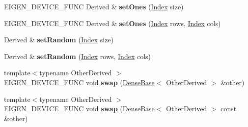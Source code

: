 \begin{DoxyCompactItemize}
E\+I\+G\+E\+N\+\_\+\+D\+E\+V\+I\+C\+E\+\_\+\+F\+U\+NC Derived \& {\bfseries set\+Ones} (\hyperlink{namespace_eigen_a62e77e0933482dafde8fe197d9a2cfde}{Index} size)
\item 
\mbox{\label{class_eigen_1_1_plain_object_base_a244c15ed04668e3b22b2ac600ada2cd8}} 
E\+I\+G\+E\+N\+\_\+\+D\+E\+V\+I\+C\+E\+\_\+\+F\+U\+NC Derived \& {\bfseries set\+Ones} (\hyperlink{namespace_eigen_a62e77e0933482dafde8fe197d9a2cfde}{Index} rows, \hyperlink{namespace_eigen_a62e77e0933482dafde8fe197d9a2cfde}{Index} cols)
\item 
\mbox{\label{class_eigen_1_1_plain_object_base_a3c917b35f8f603965c0dbe27de50e71e}} 
Derived \& {\bfseries set\+Random} (\hyperlink{namespace_eigen_a62e77e0933482dafde8fe197d9a2cfde}{Index} size)
\item 
\mbox{\label{class_eigen_1_1_plain_object_base_a12dd30c1a129192cc6f812efb9061b86}} 
Derived \& {\bfseries set\+Random} (\hyperlink{namespace_eigen_a62e77e0933482dafde8fe197d9a2cfde}{Index} rows, \hyperlink{namespace_eigen_a62e77e0933482dafde8fe197d9a2cfde}{Index} cols)
\item 
\mbox{\label{class_eigen_1_1_plain_object_base_aa86254240c534cc55143f38af58c8bdf}} 
{\footnotesize template$<$typename Other\+Derived $>$ }\\E\+I\+G\+E\+N\+\_\+\+D\+E\+V\+I\+C\+E\+\_\+\+F\+U\+NC void {\bfseries swap} (\hyperlink{group___core___module_class_eigen_1_1_dense_base}{Dense\+Base}$<$ Other\+Derived $>$ \&other)
\item 
\mbox{\label{class_eigen_1_1_plain_object_base_a7a975e6a0ec50637ef56e72dc732717e}} 
{\footnotesize template$<$typename Other\+Derived $>$ }\\E\+I\+G\+E\+N\+\_\+\+D\+E\+V\+I\+C\+E\+\_\+\+F\+U\+NC void {\bfseries swap} (\hyperlink{group___core___module_class_eigen_1_1_dense_base}{Dense\+Base}$<$ Other\+Derived $>$ const \&other)
\end{DoxyCompactItemize}
